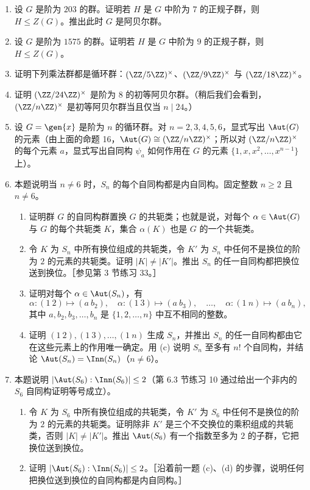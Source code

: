 \begin{enumerate}[label=\arabic*.]
  \item 设 $G$ 是阶为 $203$ 的群。证明若 $H$ 是 $G$ 中阶为 $7$ 的正规子群，则 $H\leq Z(G)$。推出此时 $G$ 是阿贝尔群。
  \item 设 $G$ 是阶为 $1575$ 的群。证明若 $H$ 是 $G$ 中阶为 $9$ 的正规子群，则 $H\leq Z(G)$。
  \item 证明下列乘法群都是循环群：$(\ZZ/5\ZZ)^\times$、$(\ZZ/9\ZZ)^\times$ 与 $(\ZZ/18\ZZ)^\times$。
  \item 证明 $(\ZZ/24\ZZ)^\times$ 是阶为 $8$ 的初等阿贝尔群。（稍后我们会看到，$(\ZZ/n\ZZ)^\times$ 是初等阿贝尔群当且仅当 $n\mid24$。）
  \item 设 $G=\gen{x}$ 是阶为 $n$ 的循环群。对 $n=2,3,4,5,6$，显式写出 $\Aut(G)$ 的元素（由上面的命题 16，$\Aut(G)\cong(\ZZ/n\ZZ)^\times$；所以对 $(\ZZ/n\ZZ)^\times$ 的每个元素 $a$，显式写出自同构 $\psi_a$ 如何作用在 $G$ 的元素 $\{1,x,x^2,\ldots,x^{n-1}\}$ 上）。
  \item 本题说明当 $n\neq6$ 时，$S_n$ 的每个自同构都是内自同构。固定整数 $n\geq2$ 且 $n\neq6$。
  \begin{enumerate}[label=(\alph*)]
    \item 证明群 $G$ 的自同构群置换 $G$ 的共轭类；也就是说，对每个 $\alpha\in\Aut(G)$ 与 $G$ 的每个共轭类 $K$，集合 $\alpha(K)$ 也是 $G$ 的一个共轭类。
    \item 令 $K$ 为 $S_n$ 中所有换位组成的共轭类，令 $K'$ 为 $S_n$ 中任何不是换位的阶为 $2$ 的元素的共轭类。证明 $|K|\neq |K'|$。推出 $S_n$ 的任一自同构都把换位送到换位。［参见第 3 节练习 33。］
    \item 证明对每个 $\alpha\in\Aut(S_n)$，有
    \[
      \alpha:(1\ 2)\mapsto(a\ b_2),\quad
      \alpha:(1\ 3)\mapsto(a\ b_3),\quad\ldots,\quad
      \alpha:(1\ n)\mapsto(a\ b_n),
    \]
    其中 $a,b_2,b_3,\ldots,b_n$ 是 $\{1,2,\ldots,n\}$ 中互不相同的整数。
    \item 证明 $(1\ 2),(1\ 3),\ldots,(1\ n)$ 生成 $S_n$，并推出 $S_n$ 的任一自同构都由它在这些元素上的作用唯一确定。用 (c) 说明 $S_n$ 至多有 $n!$ 个自同构，并结论 $\Aut(S_n)=\Inn(S_n)$（$n\neq6$）。
  \end{enumerate}
  \item 本题说明 $|\Aut(S_6):\Inn(S_6)|\leq2$（第 6.3 节练习 10 通过给出一个非内的 $S_6$ 自同构证明等号成立）。
  \begin{enumerate}[label=(\alph*)]
    \item 令 $K$ 为 $S_6$ 中所有换位组成的共轭类，令 $K'$ 为 $S_6$ 中任何不是换位的阶为 $2$ 的元素的共轭类。证明除非 $K'$ 是三个不交换位的乘积组成的共轭类，否则 $|K|\neq|K'|$。推出 $\Aut(S_6)$ 有一个指数至多为 $2$ 的子群，它把换位送到换位。
    \item 证明 $|\Aut(S_6):\Inn(S_6)|\leq2$。［沿着前一题 (c)、(d) 的步骤，说明任何把换位送到换位的自同构都是内自同构。］
  \end{enumerate}
\end{enumerate}

